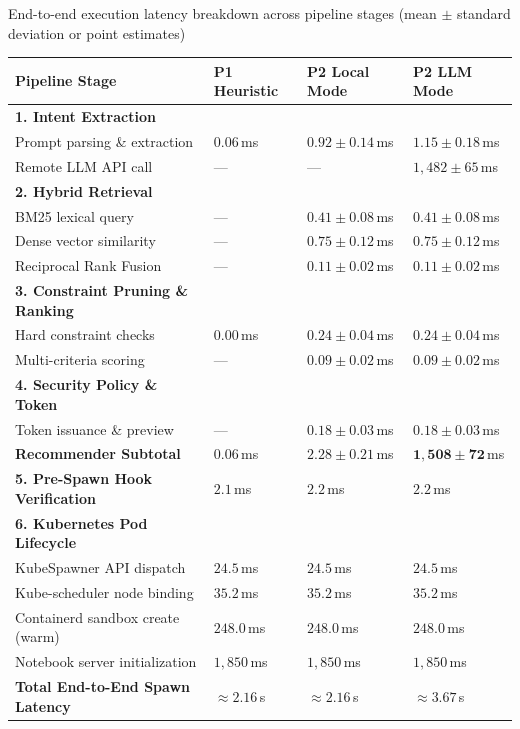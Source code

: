 \begin{table}[ht]{End-to-end execution latency breakdown across pipeline stages (mean $\pm$ standard deviation or point estimates)}
\label{tab:e2e_latency}
\centering
\small
\begin{tabular}{p{4.8cm}p{2.7cm}p{2.8cm}p{3.0cm}}
\toprule
Pipeline Stage & P1 Heuristic & P2 Local Mode & P2 LLM Mode \\
\midrule
\textbf{1. Intent Extraction} & & & \\
\quad Prompt parsing \& extraction & $0.06$\,ms & $0.92 \pm 0.14$\,ms & $1.15 \pm 0.18$\,ms \\
\quad Remote LLM API call & --- & --- & $1,482 \pm 65$\,ms \\
\textbf{2. Hybrid Retrieval} & & & \\
\quad BM25 lexical query & --- & $0.41 \pm 0.08$\,ms & $0.41 \pm 0.08$\,ms \\
\quad Dense vector similarity & --- & $0.75 \pm 0.12$\,ms & $0.75 \pm 0.12$\,ms \\
\quad Reciprocal Rank Fusion & --- & $0.11 \pm 0.02$\,ms & $0.11 \pm 0.02$\,ms \\
\textbf{3. Constraint Pruning \& Ranking} & & & \\
\quad Hard constraint checks & $0.00$\,ms & $0.24 \pm 0.04$\,ms & $0.24 \pm 0.04$\,ms \\
\quad Multi-criteria scoring & --- & $0.09 \pm 0.02$\,ms & $0.09 \pm 0.02$\,ms \\
\textbf{4. Security Policy \& Token} & & & \\
\quad Token issuance \& preview & --- & $0.18 \pm 0.03$\,ms & $0.18 \pm 0.03$\,ms \\
\midrule
\textbf{Recommender Subtotal} & $\mathbf{0.06}$\,ms & $\mathbf{2.28 \pm 0.21}$\,ms & $\mathbf{1,508 \pm 72}$\,ms \\
\midrule
\textbf{5. Pre-Spawn Hook Verification} & $2.1$\,ms & $2.2$\,ms & $2.2$\,ms \\
\textbf{6. Kubernetes Pod Lifecycle} & & & \\
\quad KubeSpawner API dispatch & $24.5$\,ms & $24.5$\,ms & $24.5$\,ms \\
\quad Kube-scheduler node binding & $35.2$\,ms & $35.2$\,ms & $35.2$\,ms \\
\quad Containerd sandbox create (warm) & $248.0$\,ms & $248.0$\,ms & $248.0$\,ms \\
\quad Notebook server initialization & $1,850$\,ms & $1,850$\,ms & $1,850$\,ms \\
\midrule
\textbf{Total End-to-End Spawn Latency} & $\approx \mathbf{2.16}$\,s & $\approx \mathbf{2.16}$\,s & $\approx \mathbf{3.67}$\,s \\
\bottomrule
\end{tabular}
\end{table}
